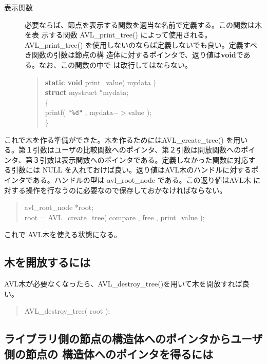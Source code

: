 \begin{description}
\item[表示関数]
\begin{sloppypar}
必要ならば、節点を表示する関数を適当な名前で定義する。この関数は木を表
示する関数 AVL\_print\_tree() によって使用される。AVL\_print\_tree() 
を使用しないのならば定義しないでも良い。定義すべき関数の引数は節点の構
造体に対するポインタで、返り値は{\bf void}である。なお、この関数の中で
は改行してはならない。
\end{sloppypar}
\begin{quote}
{\bf static void} print\_value( mydata )\\
{\bf struct} mystruct *mydata;\\
\{\\
\hspace*{1cm}printf( \verb+"%d"+ , mydata$->$value );\\
\}
\end{quote}
\end{description}

\begin{sloppypar}
これで木を作る準備ができた。木を作るためにはAVL\_create\_tree() を用い
る。第１引数はユーザの比較関数へのポインタ、第２引数は開放関数へのポイ
ンタ、第３引数は表示関数へのポインタである。定義しなかった関数に対応す
る引数には NULL を入れておけば良い。返り値はAVL木のハンドルに対するポ
インタである。ハンドルの型は avl\_root\_node である。この返り値はAVL木
に対する操作を行なうのに必要なので保存しておかなければならない。
\end{sloppypar}

\begin{quote}
avl\_root\_node	*root;\\
root = AVL\_create\_tree( compare , free , print\_value );
\end{quote}

これで AVL木を使える状態になる。

\subsection{木を開放するには}
AVL木が必要なくなったら、AVL\_destroy\_tree()を用いて木を開放すれば良
い。
\begin{quote}
AVL\_destroy\_tree( root );
\end{quote}

\subsection{ライブラリ側の節点の構造体へのポインタからユーザ側の節点の
構造体へのポインタを得るには}

